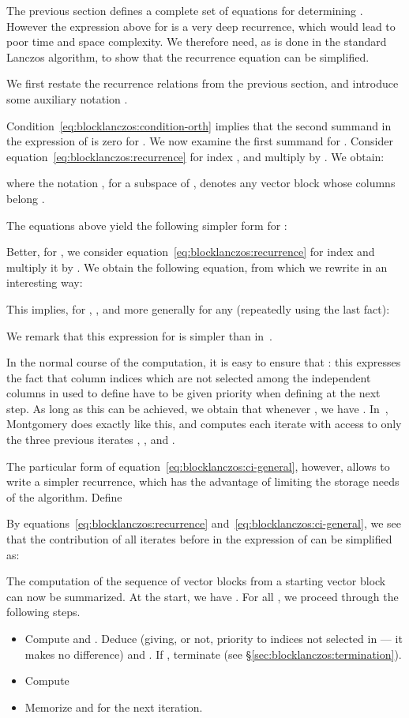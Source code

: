 The previous section defines a complete set of equations for determining
.  However the expression above for  is a very deep
recurrence, which would lead to poor time and space complexity. We
therefore need, as is done in the standard
Lanczos algorithm, to show that the recurrence equation can be
simplified.

We first restate the recurrence relations from the previous section, and
introduce some auxiliary notation .

Condition~\eqref{eq:blocklanczos:condition-orth} implies that the
second summand in the expression of  is zero for .
We now examine
the first summand for .
Consider equation~\eqref{eq:blocklanczos:recurrence} for index , and
multiply by . We obtain:

where the notation , for  a
subspace of , denotes any vector
block whose columns belong .

The equations above yield the following simpler form for
:

Better, for , we
consider
equation~\eqref{eq:blocklanczos:recurrence} for index  and
multiply it by . We obtain the following equation, from
which we rewrite  in an interesting way:

This implies, for , , and more generally for any 
(repeatedly using the last fact):


We remark that this expression for  is simpler than 
in~\cite{EC:Montgomery95}.

In the normal course of the computation, it is easy to ensure that
: this expresses the fact that column indices
which are not selected among the independent columns in 
used to define  have to be given priority when defining
 at the next step. As long as this can be achieved, we obtain
that whenever , we have .
In~\cite{EC:Montgomery95}, Montgomery does exactly like this, and computes
each iterate  with access to only the
three previous iterates , , and .

The particular form of equation~\eqref{eq:blocklanczos:ci-general},
however, allows to write a simpler recurrence, which has the advantage of
limiting the storage needs of the algorithm. Define

By equations~\eqref{eq:blocklanczos:recurrence}
and~\eqref{eq:blocklanczos:ci-general}, we see that the contribution of
all iterates before  in the expression of  can be
simplified as:





The computation of the sequence of vector blocks
 from a starting vector block  can now be
summarized. At the start, we have .
For all , we proceed through the following steps.
\begin{itemize}
    \item Compute  and
        .
        Deduce  (giving, or not, priority to indices not selected
        in  --- it makes no difference) and .
        If , terminate (see §\ref{sec:blocklanczos:termination}).
    \item Compute
        
    \item Memorize  and  for the next iteration.
\end{itemize}

